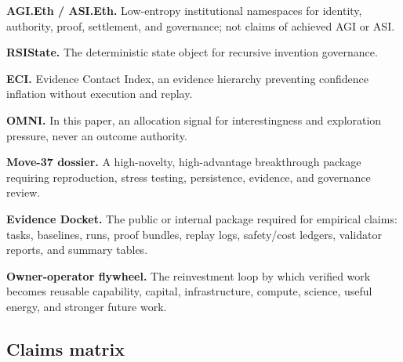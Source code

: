 \documentclass[
  11pt,
]{article}
\begin{document}
\textbf{AGI.Eth / ASI.Eth.} Low-entropy institutional namespaces for
identity, authority, proof, settlement, and governance; not claims of
achieved AGI or ASI.

\textbf{RSIState.} The deterministic state object for recursive
invention governance.

\textbf{ECI.} Evidence Contact Index, an evidence hierarchy preventing
confidence inflation without execution and replay.

\textbf{OMNI.} In this paper, an allocation signal for interestingness
and exploration pressure, never an outcome authority.

\textbf{Move-37 dossier.} A high-novelty, high-advantage breakthrough
package requiring reproduction, stress testing, persistence, evidence,
and governance review.

\textbf{Evidence Docket.} The public or internal package required for
empirical claims: tasks, baselines, runs, proof bundles, replay logs,
safety/cost ledgers, validator reports, and summary tables.

\textbf{Owner-operator flywheel.} The reinvestment loop by which
verified work becomes reusable capability, capital, infrastructure,
compute, science, useful energy, and stronger future work.

\subsection{Claims matrix}\label{claims-matrix}
\end{document}
